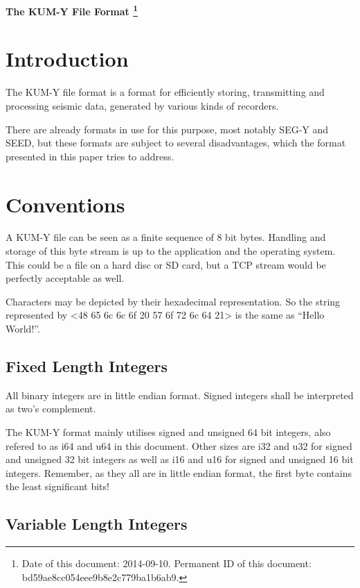 \documentclass[DIV=10]{scrartcl}
\begin{document}
\strut

\vspace{1cm}

\centerline{\huge \textbf{The KUM-Y File Format%
\footnote{\raggedright Date of this document: 2014-09-10.
Permanent ID of this document: bd59ae8cc054eee9b8e2c779ba1b6ab9.}}}

\vspace{1cm}

\section{Introduction}

The KUM-Y file format is a format for efficiently storing, transmitting and processing seismic data, generated by various kinds of recorders.

There are already formats in use for this purpose, most notably SEG-Y and SEED, but these formats are subject to several disadvantages, which the format presented in this paper tries to address.

\section{Conventions}

A KUM-Y file can be seen as a finite sequence of 8 bit bytes.
Handling and storage of this byte stream is up to the application and the operating system.
This could be a file on a hard disc or SD card, but a TCP stream would be perfectly acceptable as well.

Characters may be depicted by their hexadecimal representation.
So the string represented by <48 65 6c 6c 6f 20 57 6f 72 6c 64 21> is the same as “Hello World!”.

\subsection{Fixed Length Integers}

All binary integers are in little endian format.
Signed integers shall be interpreted as two’s complement.

The KUM-Y format mainly utilises signed and unsigned 64 bit integers, also refered to as i64 and u64 in this document.
Other sizes are i32 and u32 for signed and unsigned 32 bit integers as well as i16 and u16 for signed and unsigned 16 bit integers.
Remember, as they all are in little endian format, the first byte contains the least significant bits!

\subsection{Variable Length Integers}
\end{document}
